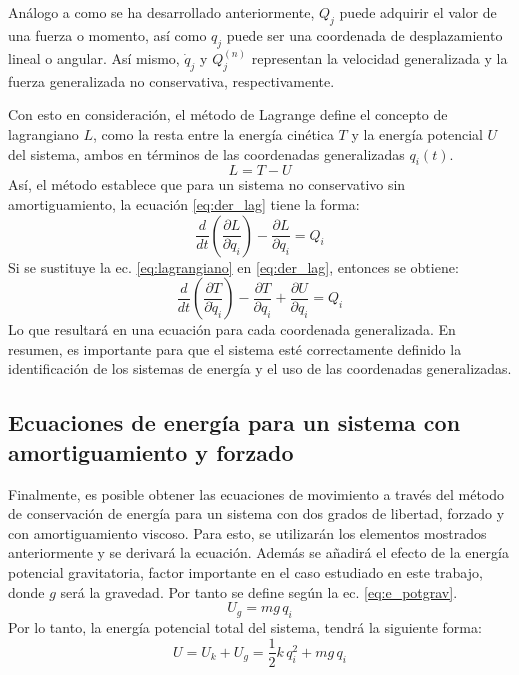 Análogo a como se ha desarrollado anteriormente, $Q_j$ puede adquirir el valor de una fuerza o momento, así como $q_j$ puede ser una coordenada de desplazamiento lineal o angular. Así mismo, $\dot{q}_j$ y $Q_j^{(n)}$ representan la velocidad generalizada y la fuerza generalizada no conservativa, respectivamente.

Con esto en consideración, el método de Lagrange define el concepto de lagrangiano $L$, como la resta entre la energía cinética $T$ y la energía potencial $U$ del sistema, ambos en términos de las coordenadas generalizadas $q_i(t)$.
\begin{equation}\label{eq:lagrangiano}
	L = T - U
\end{equation} 
Así, el método establece que para un sistema no conservativo sin amortiguamiento, la ecuación \ref{eq:der_lag} tiene la forma:
\begin{equation}\label{eq:der_lag}
	\frac{d}{dt}\left(\frac{\partial L}{\partial \dot{q}_i}\right) - \frac{\partial L}{\partial q_i} = Q_i
\end{equation}
Si se sustituye la ec. \ref{eq:lagrangiano} en \ref{eq:der_lag}, entonces se obtiene:
\begin{equation}\label{eq:der_lagconsv}
	\frac{d}{dt}\left(\frac{\partial T}{\partial \dot{q}_i}\right) - \frac{\partial T}{\partial q_i} + \frac{\partial U}{\partial q_i} = Q_i
\end{equation}
Lo que resultará en una ecuación para cada coordenada generalizada. En resumen, es importante para que el sistema esté correctamente definido la identificación de los sistemas de energía y el uso de las coordenadas generalizadas. 


\subsection{Ecuaciones de energía para un sistema con amortiguamiento y forzado}
Finalmente, es posible obtener las ecuaciones de movimiento a través del método de conservación de energía para un sistema con dos grados de libertad, forzado y con amortiguamiento viscoso. Para esto, se utilizarán los elementos mostrados anteriormente y se derivará la ecuación. Además se añadirá el efecto de la energía potencial gravitatoria, factor importante en el caso estudiado en este trabajo, donde $g$ será la gravedad. Por tanto se define según la ec. \ref{eq:e_potgrav}. 
\begin{equation}\label{eq:e_potgrav}
	U_g = mg\,q_i
\end{equation}
Por lo tanto, la energía potencial total del sistema, tendrá la siguiente forma:
\begin{equation}\label{eq:e_potencial}
	U = U_k + U_g = \frac{1}{2}k\,q_i^2 + mg\,q_i
\end{equation}

